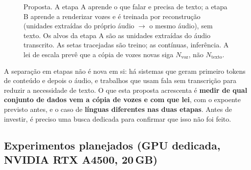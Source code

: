 \documentclass[a4paper,11pt]{article}
\begin{document}
\begin{figure}[H]
{}
\caption{Proposta. A etapa A aprende o que falar e precisa de texto; a etapa B aprende a renderizar vozes e é treinada por reconstrução (unidades extraídas do próprio áudio $\rightarrow$ o mesmo áudio), sem texto. Os alvos da etapa A são as unidades extraídas do áudio transcrito. As setas tracejadas são treino; as contínuas, inferência. A lei de escala prevê que a cópia de vozes novas siga $N_{\text{voz}}$, não $N_{\text{texto}}$.}
\label{fig:proposta}
\end{figure}

A separação em etapas não é nova em si: há sistemas que geram primeiro tokens de conteúdo e depois o áudio, e trabalhos que usam fala sem transcrição para reduzir a necessidade de texto. O que esta proposta acrescenta é \textbf{medir de qual conjunto de dados vem a cópia de vozes e com que lei}, com o expoente previsto antes, e o caso de \textbf{línguas diferentes nas duas etapas}. Antes de investir, é preciso uma busca dedicada para confirmar que isso não foi feito.

\subsection{Experimentos planejados (GPU dedicada, NVIDIA RTX A4500, 20\,GB)}
\end{document}
